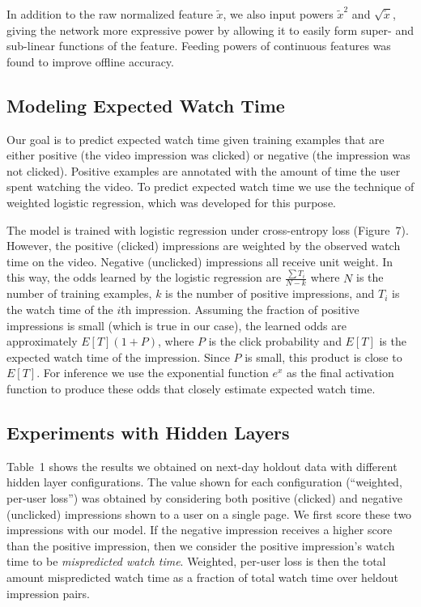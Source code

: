 In addition to the raw normalized feature $\tilde{x}$, we also input powers
$\tilde{x}^2$ and $\sqrt{\tilde{x}}$, giving the network more expressive
power by allowing it to easily form super- and sub-linear functions of the
feature. Feeding powers of continuous features was found to improve offline
accuracy.

\subsection{Modeling Expected Watch Time}

Our goal is to predict expected watch time given training examples that are
either positive (the video impression was clicked) or negative (the
impression was not clicked). Positive examples are annotated with the amount
of time the user spent watching the video. To predict expected watch time we
use the technique of weighted logistic regression, which was developed for
this purpose.

The model is trained with logistic regression under cross-entropy loss
(Figure~7). However, the positive (clicked) impressions are weighted by the
observed watch time on the video. Negative (unclicked) impressions all
receive unit weight. In this way, the odds learned by the logistic
regression are $\frac{\sum T_i}{N - k}$ where $N$ is the number of training
examples, $k$ is the number of positive impressions, and $T_i$ is the watch
time of the $i$th impression. Assuming the fraction of positive impressions
is small (which is true in our case), the learned odds are approximately
$E[T](1 + P)$, where $P$ is the click probability and $E[T]$ is the expected
watch time of the impression. Since $P$ is small, this product is close to
$E[T]$. For inference we use the exponential function $e^x$ as the final
activation function to produce these odds that closely estimate expected
watch time.

\subsection{Experiments with Hidden Layers}

Table~1 shows the results we obtained on next-day holdout data with
different hidden layer configurations. The value shown for each
configuration (``weighted, per-user loss'') was obtained by considering both
positive (clicked) and negative (unclicked) impressions shown to a user on a
single page. We first score these two impressions with our model. If the
negative impression receives a higher score than the positive impression,
then we consider the positive impression's watch time to be \textit{mispredicted
watch time}. Weighted, per-user loss is then the total amount mispredicted
watch time as a fraction of total watch time over heldout impression pairs.

